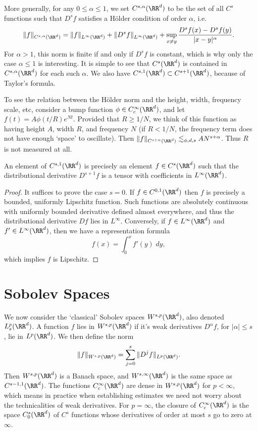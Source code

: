 More generally, for any $0 \leq \alpha \leq 1$, we set $C^{s,\alpha}(\RR^d)$ to be the set of all $C^s$ functions such that $D^s f$ satisfies a H\"{o}lder condition of order $\alpha$, i.e.
%
\[ \| f \|_{C^{s,\alpha}(\RR^d)} = \| f \|_{L^\infty(\RR^d)} + \| D^s f \|_{L^\infty(\RR^d)} + \sup_{x \neq y} \frac{D^sf(x) - D^s f(y)}{|x - y|^\alpha}. \]
%
For $\alpha > 1$, this norm is finite if and only if $D^s f$ is constant, which is why only the case $\alpha \leq 1$ is interesting. It is simple to see that $C^s(\RR^d)$ is contained in $C^{s,\alpha}(\RR^d)$ for each such $\alpha$. We also have $C^{s,1}(\RR^d) \subset C^{s+1}(\RR^d)$, because of Taylor's formula.

\begin{example}
    To see the relation between the H\"{o}lder norm and the height, width, frequency scale, etc, consider a bump function $\phi \in C_c^\infty(\RR^d)$, and let $f(t) = A \phi(t/R) e^{Nt}$. Provided that $R \geq 1/N$, we think of this function as having height $A$, width $R$, and frequency $N$ (if $R < 1/N$, the frequency term does not have enough `space' to oscillate). Then $\| f \|_{C^{s+\alpha}(\RR^d)} \lesssim_{\phi,d,s} A N^{s+\alpha}$. Thus $R$ is not measured at all.
\end{example}

\begin{lemma}
    An element of $C^{s,1}(\RR^d)$ is precisely an element $f \in C^s(\RR^d)$ such that the distributional derivative $D^{s+1}f$ is a tensor with coefficients in $L^\infty(\RR^d)$.
\end{lemma}
\begin{proof}
    It suffices to prove the case $s = 0$. If $f \in C^{0,1}(\RR^d)$ then $f$ is precisely a bounded, uniformly Lipschitz function. Such functions are absolutely continuous with uniformly bounded derivative defined almost everywhere, and thus the distributional derivative $Df$ lies in $L^\infty$. Conversely, if $f \in L^\infty(\RR^d)$ and $f' \in L^\infty(\RR^d)$, then we have a representation formula
    \[ f(x) = \int_0^x f'(y)\; dy, \]
    which implies $f$ is Lipschitz.
\end{proof}


\section{Sobolev Spaces}

We now consider the `classical' Sobolev spaces $W^{s,p}(\RR^d)$, also denoted $L^p_s(\RR^d)$. A function $f$ lies in $W^{s,p}(\RR^d)$ if it's weak derivatives $D^\alpha f$, for $|\alpha| \leq s$, lie in $L^p(\RR^d)$. We then define the norm
%
\[ \| f \|_{W^{s,p}(\RR^d)} = \sum_{j = 0}^s \| D^j f \|_{L^p(\RR^d)}. \]
%
Then $W^{s,p}(\RR^d)$ is a Banach space, and $W^{s,\infty}(\RR^d)$ is the same space as $C^{s-1,1}(\RR^d)$. The functions $C_c^\infty(\RR^d)$ are dense in $W^{s,p}(\RR^d)$ for $p < \infty$, which means in practice when establishing estimates we need not worry about the technicalities of weak derivatives. For $p = \infty$, the closure of $C_c^\infty(\RR^d)$ is the space $C^s_0(\RR^d)$ of $C^s$ functions whose derivatives of order at most $s$ go to zero at $\infty$.

